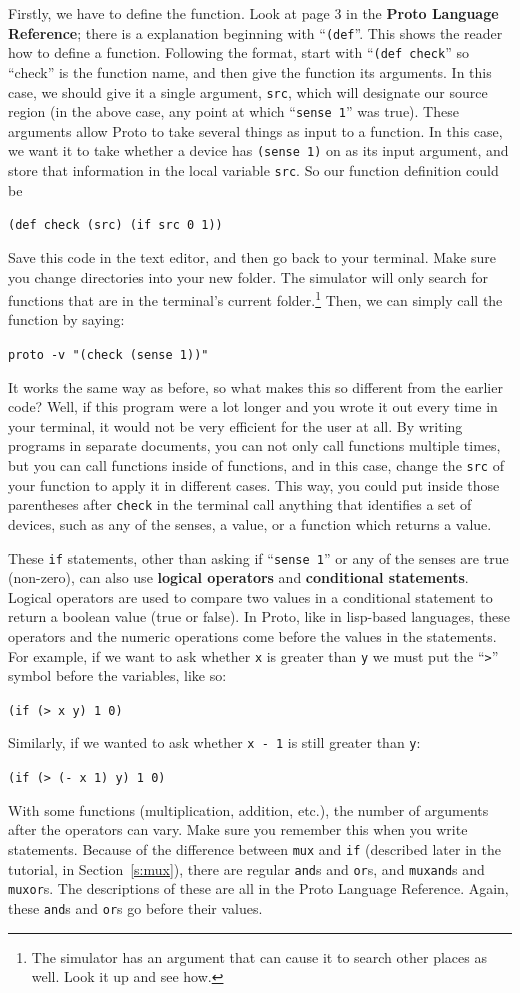 \documentclass{article}
\newcommand\code[1]{\begin{center}\var{#1}\end{center}}
\newcommand\var[1]{{\tt #1}}
\newcommand\qvar[1]{``{\tt #1}''}
\begin{document}
Firstly, we have to define the function.  Look at page 3 in the {\bf
  Proto Language Reference}; there is a explanation beginning with
\qvar{(def}.  This shows the reader how to define a function.
Following the format, start with \qvar{(def check} so ``check'' is the
function name, and then give the function its arguments.  In this
case, we should give it a single argument, \var{src}, which will
designate our source region (in the above case, any point at which
\qvar{sense 1} was true).  These arguments allow Proto to take several
things as input to a function.  In this case, we want it to take
whether a device has \var{(sense 1)} on as its input argument, and store
that information in the local variable \var{src}. So our function definition
could be \code{(def check (src) (if src 0 1))}

Save this code in the text editor, and then go back to your terminal.  Make
sure you change directories into your new folder.  The simulator will
only search for functions that are in the terminal's current
folder.\footnote{The simulator has an argument that can cause it to
  search other places as well.  Look it up and see how.}  Then, we can
simply call the function by saying:

\code{proto -v "(check (sense 1))"}

It works the same way as before, so what makes this so different from
the earlier code?  Well, if this program were a lot longer and you
wrote it out every time in your terminal, it would not be very
efficient for the user at all.  By writing programs in separate
documents, you can not only call functions multiple times, but you can
call functions inside of functions, and in this case, change the
\var{src} of your function to apply it in different cases.  This way,
you could put inside those parentheses after \var{check} in the
terminal call anything that identifies a set of devices, such as any
of the senses, a value, or a function which returns a value.

These \var{if} statements, other than asking if \qvar{sense 1} or any
of the senses are true (non-zero), can also use {\bf logical
  operators} and {\bf conditional statements}.  Logical operators are
used to compare two values in a conditional statement to return a
boolean value (true or false).  In Proto, like in lisp-based
languages, these operators and the numeric operations come before the
values in the statements.  For example, if we want to ask whether
\var{x} is greater than \var{y} we must put the \qvar{>} symbol
before the variables, like so: \code{(if (> x y) 1 0)}  Similarly, if we
wanted to ask whether \var{x - 1} is still greater than \var{y}:
\code{(if (> (- x 1) y) 1 0)} With some functions (multiplication,
addition, etc.), the number of arguments after the operators can vary.
Make sure you remember this when you write statements.  Because of the
difference between \var{mux} and \var{if} (described later in the
tutorial, in Section~\ref{s:mux}), there are regular \var{and}s and
\var{or}s, and \var{muxand}s and \var{muxor}s.  The descriptions of
these are all in the Proto Language Reference.  Again, these
\var{and}s and \var{or}s go before their values.
\end{document}
